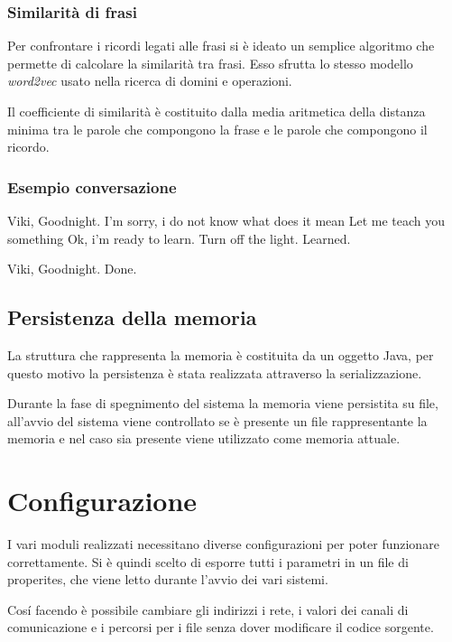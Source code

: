 \documentclass[twoside]{supsistudent}
\begin{document}
\subsection{Similarità di frasi}
Per confrontare i ricordi legati alle frasi si è ideato un semplice algoritmo che permette di calcolare la similarità tra frasi. Esso sfrutta lo stesso modello \textit{word2vec} usato nella ricerca di domini e operazioni.

Il coefficiente di similarità è costituito dalla media aritmetica della distanza minima tra le parole che compongono la frase e le parole che compongono il ricordo.

\subsection{Esempio conversazione}
\begin{dialogue}
 Viki, Goodnight.
 I'm sorry, i do not know what does it mean
 Let me teach you something
 Ok, i'm ready to learn.
 Turn off the light.
 Learned.
\end{dialogue}
\begin{dialogue}
 Viki, Goodnight.
 Done.
\end{dialogue}

\section{Persistenza della memoria}
La struttura che rappresenta la memoria è costituita da un oggetto Java, per questo motivo la persistenza è stata realizzata attraverso la serializzazione.

Durante la fase di spegnimento del sistema la memoria viene persistita su file, all'avvio del sistema viene controllato se è presente un file rappresentante la memoria e nel caso sia presente viene utilizzato come memoria attuale.

\chapter{Configurazione}
I vari moduli realizzati necessitano diverse configurazioni per poter funzionare correttamente. Si è quindi scelto di esporre tutti i parametri in un file di properites, che viene letto durante l'avvio dei vari sistemi. 

Cosí facendo è possibile cambiare gli indirizzi i rete, i valori dei canali di comunicazione e i percorsi per i file senza dover modificare il codice sorgente.
\end{document}
